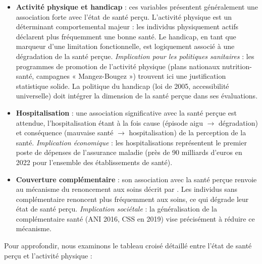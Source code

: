 \documentclass[11pt,a4paper]{memoirerecherche}
\begin{document}
\begin{itemize}
\item
  \textbf{Activité physique et handicap} : ces variables présentent généralement une association forte avec l'état de santé perçu. L'activité physique est un déterminant comportemental majeur : les individus physiquement actifs déclarent plus fréquemment une bonne santé. Le handicap, en tant que marqueur d'une limitation fonctionnelle, est logiquement associé à une dégradation de la santé perçue. \emph{Implication pour les politiques sanitaires} : les programmes de promotion de l'activité physique (plans nationaux nutrition-santé, campagnes « Mangez-Bougez ») trouvent ici une justification statistique solide. La politique du handicap (loi de 2005, accessibilité universelle) doit intégrer la dimension de la santé perçue dans ses évaluations.
\item
  \textbf{Hospitalisation} : une association significative avec la santé perçue est attendue, l'hospitalisation étant à la fois cause (épisode aigu \(\rightarrow\) dégradation) et conséquence (mauvaise santé \(\rightarrow\) hospitalisation) de la perception de la santé. \emph{Implication économique} : les hospitalisations représentent le premier poste de dépenses de l'assurance maladie (près de 90 milliards d'euros en 2022 pour l'ensemble des établissements de santé).
\item
  \textbf{Couverture complémentaire} : son association avec la santé perçue renvoie au mécanisme du renoncement aux soins décrit par \textcite{despres2011}. Les individus sans complémentaire renoncent plus fréquemment aux soins, ce qui dégrade leur état de santé perçu. \emph{Implication sociétale} : la généralisation de la complémentaire santé (ANI 2016, CSS en 2019) vise précisément à réduire ce mécanisme.
\end{itemize}

Pour approfondir, nous examinons le tableau croisé détaillé entre l'état de santé perçu et l'activité physique :

\begin{table}[!h]
\centering
\caption{\label{tab:tab-chi2-activite}Tableau croisé : État de santé perçu $\times$ Activité physique (effectifs).}
\centering
{}
\end{table}
\end{document}
